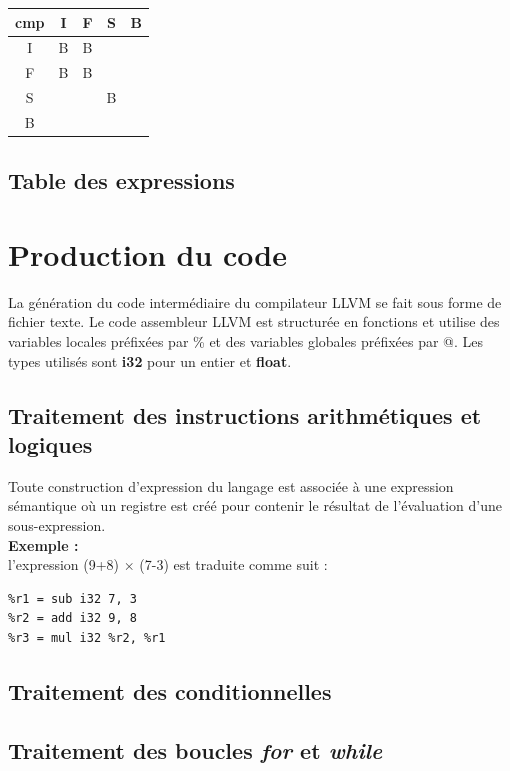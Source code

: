 \documentclass{article}
\begin{document}
\begin{center}
\begin{tabular}{|c|c|c|c|c|}
  \hline
  cmp & I & F & S & B \\
  \hline
  I & B & B &   &  \\
  \hline
  F & B & B &   & \\
  \hline
  S &   &   & B  & \\
  \hline
  B & & & & \\
\hline
\end{tabular}
\end{center}


\subsection{Table des expressions}

\section{Production du code}

La génération du code intermédiaire du compilateur LLVM se fait sous forme de fichier texte. Le code assembleur LLVM est structurée en fonctions et utilise des variables locales préfixées par \% et des variables globales préfixées par @. Les types utilisés sont \textbf{i32} pour un entier et \textbf{float}. \\

\subsection{Traitement des instructions arithmétiques et logiques}
Toute construction d'expression du langage est associée à une expression sémantique où un registre est créé pour contenir le résultat de l'évaluation d'une sous-expression. \\

\noindent \textbf{Exemple :} \\
l'expression (9+8) $\times$ (7-3) est traduite comme suit :
\begin{verbatim}
%r1 = sub i32 7, 3 
%r2 = add i32 9, 8 
%r3 = mul i32 %r2, %r1 
\end{verbatim}

\subsection{Traitement des conditionnelles}
\subsection{Traitement des boucles \emph{for} et \emph{while}}
\end{document}
